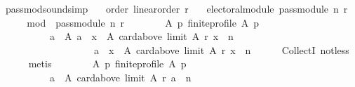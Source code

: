 \begin{isabellebody}
\isadelimdocument
%
\endisadelimdocument
%
\isatagdocument
%
\isamarkuptrue%
%
\endisatagdocument
{\isafolddocument}%
%
\isadelimdocument
%
\endisadelimdocument
{}\isamarkupfalse%
\ pass{\isacharunderscore}{\kern0pt}mod{\isacharunderscore}{\kern0pt}sound{\isacharbrackleft}{\kern0pt}simp{\isacharbrackright}{\kern0pt}{\isacharcolon}{\kern0pt}\isanewline
\ \ \ order{\isacharcolon}{\kern0pt}\ {\isachardoublequoteopen}linear{\isacharunderscore}{\kern0pt}order\ r{\isachardoublequoteclose}\isanewline
\ \ \ {\isachardoublequoteopen}electoral{\isacharunderscore}{\kern0pt}module\ {\isacharparenleft}{\kern0pt}pass{\isacharunderscore}{\kern0pt}module\ n\ r{\isacharparenright}{\kern0pt}{\isachardoublequoteclose}\isanewline
%
\isadelimproof
%
\endisadelimproof
%
\isatagproof
{}\isamarkupfalse%
\ {\isacharminus}{\kern0pt}\isanewline
\ \ \isamarkupfalse%
\ {\isacharquery}{\kern0pt}mod\ {\isacharequal}{\kern0pt}\ {\isachardoublequoteopen}pass{\isacharunderscore}{\kern0pt}module\ n\ r{\isachardoublequoteclose}\isanewline
\ \ \isamarkupfalse%
\isanewline
\ \ \ \ {\isachardoublequoteopen}{\isasymforall}\ A\ p{\isachardot}{\kern0pt}\ finite{\isacharunderscore}{\kern0pt}profile\ A\ p\ {\isasymlongrightarrow}\isanewline
\ \ \ \ \ \ \ \ \ \ {\isacharparenleft}{\kern0pt}{\isasymforall}a\ {\isasymin}\ A{\isachardot}{\kern0pt}\ a\ {\isasymin}\ {\isacharbraceleft}{\kern0pt}x\ {\isasymin}\ A{\isachardot}{\kern0pt}\ card{\isacharparenleft}{\kern0pt}above\ {\isacharparenleft}{\kern0pt}limit\ A\ r{\isacharparenright}{\kern0pt}\ x{\isacharparenright}{\kern0pt}\ {\isachargreater}{\kern0pt}\ n{\isacharbraceright}{\kern0pt}\ {\isasymor}\isanewline
\ \ \ \ \ \ \ \ \ \ \ \ \ \ \ \ \ \ \ a\ {\isasymin}\ {\isacharbraceleft}{\kern0pt}x\ {\isasymin}\ A{\isachardot}{\kern0pt}\ card{\isacharparenleft}{\kern0pt}above\ {\isacharparenleft}{\kern0pt}limit\ A\ r{\isacharparenright}{\kern0pt}\ x{\isacharparenright}{\kern0pt}\ {\isasymle}\ n{\isacharbraceright}{\kern0pt}{\isacharparenright}{\kern0pt}{\isachardoublequoteclose}\isanewline
\ \ \ \ \isamarkupfalse%
\ CollectI\ not{\isacharunderscore}{\kern0pt}less\isanewline
\ \ \ \ \isamarkupfalse%
\ metis\isanewline
\ \ \isamarkupfalse%
\isanewline
\ \ \ \ {\isachardoublequoteopen}{\isasymforall}\ A\ p{\isachardot}{\kern0pt}\ finite{\isacharunderscore}{\kern0pt}profile\ A\ p\ {\isasymlongrightarrow}\isanewline
\ \ \ \ \ \ \ \ \ \ {\isacharbraceleft}{\kern0pt}a\ {\isasymin}\ A{\isachardot}{\kern0pt}\ card{\isacharparenleft}{\kern0pt}above\ {\isacharparenleft}{\kern0pt}limit\ A\ r{\isacharparenright}{\kern0pt}\ a{\isacharparenright}{\kern0pt}\ {\isachargreater}{\kern0pt}\ n{\isacharbraceright}{\kern0pt}\ {\isasymunion}\isanewline

\end{isabellebody}
